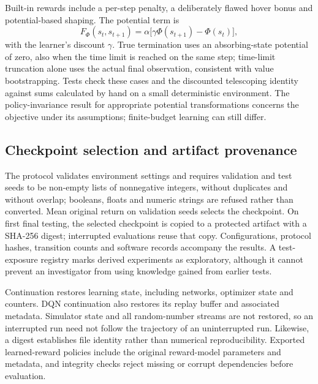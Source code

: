 \documentclass[preprint,12pt]{elsarticle}
\begin{document}
Built-in rewards include a per-step penalty, a deliberately flawed hover bonus and potential-based shaping. The potential term is
\begin{equation}
 F_{\Phi}(s_t,s_{t+1})=\alpha\bigl[\gamma\Phi(s_{t+1})-\Phi(s_t)\bigr],
 \label{eq:potential}
\end{equation}
with the learner's discount $\gamma$. True termination uses an absorbing-state potential of zero, also when the time limit is reached on the same step; time-limit truncation alone uses the actual final observation, consistent with value bootstrapping. Tests check these cases and the discounted telescoping identity against sums calculated by hand on a small deterministic environment. The policy-invariance result for appropriate potential transformations \citep{ng1999shaping} concerns the objective under its assumptions; finite-budget learning can still differ.

\subsection{Checkpoint selection and artifact provenance}
The protocol validates environment settings and requires validation and test seeds to be non-empty lists of nonnegative integers, without duplicates and without overlap; booleans, floats and numeric strings are refused rather than converted. Mean original return on validation seeds selects the checkpoint. On first final testing, the selected checkpoint is copied to a protected artifact with a SHA-256 digest; interrupted evaluations reuse that copy. Configurations, protocol hashes, transition counts and software records accompany the results. A test-exposure registry marks derived experiments as exploratory, although it cannot prevent an investigator from using knowledge gained from earlier tests.

Continuation restores learning state, including networks, optimizer state and counters. DQN continuation also restores its replay buffer and associated metadata. Simulator state and all random-number streams are not restored, so an interrupted run need not follow the trajectory of an uninterrupted run. Likewise, a digest establishes file identity rather than numerical reproducibility. Exported learned-reward policies include the original reward-model parameters and metadata, and integrity checks reject missing or corrupt dependencies before evaluation.
\end{document}

